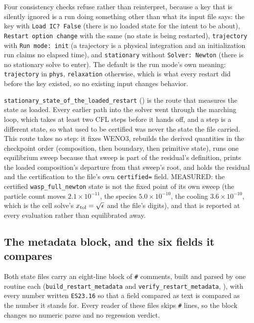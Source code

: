 \documentclass[english,a4paper]{my_memo}
\begin{document}
Four consistency checks refuse rather than reinterpret, because a key that
is silently ignored is a run doing something other than what its input file
says: the key with \verb|Load IC? False| (there is no loaded state for the
intent to be about), \verb|Restart option change| with the same
(no state is being restarted), \verb|trajectory| with \verb|Run mode: init|
(a trajectory is a physical integration and an initialization run claims no
elapsed time), and \verb|stationary| without \verb|Solver: Newton| (there is
no stationary solve to enter). The default is the run mode's own meaning:
\verb|trajectory| in \verb|phys|, \verb|relaxation| otherwise, which is what
every restart did before the key existed, so no existing input changes
behavior.

\verb|stationary_state_of_the_loaded_restart| ()
is the route that measures the state as loaded. Every earlier path into the
solver went through the marching loop, which takes at least two CFL steps
before it hands off, and a step is a different state, so what used to be
certified was never the state the file carried. This route takes no step: it
fixes WENO3, rebuilds the derived quantities in the checkpoint order
(composition, then boundary, then primitive state), runs one equilibrium
sweep because that sweep is part of the residual's definition, prints the
loaded composition's departure from that sweep's root, and holds the
residual and the certification to the file's own \verb|certified=| field.
MEASURED: the certified \verb|wasp_full_newton| state is not the fixed point
of its own sweep (the particle count moves $2.1\times10^{-11}$, the species
$5.0\times10^{-10}$, the cooling $3.6\times10^{-10}$, which is the cell
solve's $x_{\rm tol} = \sqrt{\epsilon}$ and the file's digits), and that is
reported at every evaluation rather than equilibrated away.

\subsection{The metadata block, and the six fields it compares}

Both state files carry an eight-line block of \verb|#| comments, built and
parsed by one routine each (\verb|build_restart_metadata| and
\verb|verify_restart_metadata|, ),
with every number written \verb|ES23.16| so that a field compared as text is
compared as the number it stands for. Every reader of these files skips
\verb|#| lines, so the block changes no numeric parse and no regression
verdict.
\end{document}
